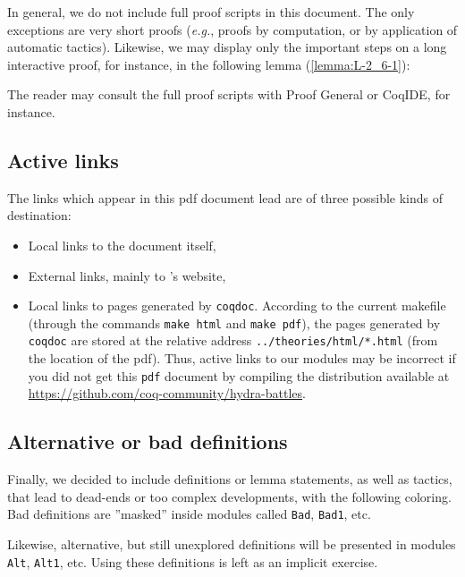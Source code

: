 \documentclass[twoside,a4paper]{book}
\newcounter{snippets}
\begin{document}
In general, we do not include full proof scripts in this document. The only exceptions are very short proofs (\emph{e.g.}, proofs by computation, or by application of automatic tactics). Likewise, we may display only the important steps on a long interactive proof, for instance, in the following lemma (\vref{lemma:L-2_6-1}):




The reader may consult the full proof scripts with Proof General or CoqIDE, for instance.

\subsection{Active links}
The  links which appear in this pdf  document lead are of three possible kinds of destination:
\begin{itemize}
\item Local links to the document itself,
\item External links, mainly to \coq's website,
\item Local links to pages generated by \texttt{coqdoc}. According to the current makefile (through the commands \texttt{make html} and \texttt{make pdf}), 
  the pages generated by \texttt{coqdoc} are stored at 
the relative address \texttt{../theories/html/*.html} (from the location of the pdf).
Thus,  active links to our \coq{} modules may be incorrect if you did not get this \texttt{pdf} document by compiling the distribution available at
\url{https://github.com/coq-community/hydra-battles}.

\end{itemize}

\subsection{Alternative or bad definitions}
\label{sect:alt-proofs}
Finally, we decided to include definitions or lemma statements, as well as tactics,  that lead to
dead-ends or too complex developments, with the following coloring.
Bad definitions 
 are ''masked'' inside modules called \texttt{Bad}, \texttt{Bad1}, etc.





Likewise, alternative, but still unexplored definitions will be presented in modules
\texttt{Alt}, \texttt{Alt1}, etc. Using these definitions is left as an implicit exercise.
\end{document}
